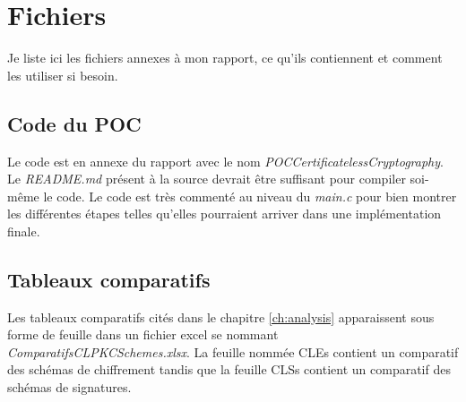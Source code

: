 \chapter{Fichiers}
\label{ch:fichiers}
Je liste ici les fichiers annexes à mon rapport, ce qu'ils contiennent et comment les utiliser si besoin.
\section{Code du POC}
Le code est en annexe du rapport avec le nom \textit{POCCertificatelessCryptography}.
Le \textit{README.md} présent à la source devrait être suffisant pour compiler soi-même le code. 
Le code est très commenté au niveau du \textit{main.c} pour bien montrer les différentes étapes telles qu'elles pourraient arriver dans une implémentation finale.
\section{Tableaux comparatifs}
Les tableaux comparatifs cités dans le chapitre \ref{ch:analysis} apparaissent sous forme de feuille dans un fichier excel se nommant \textit{ComparatifsCLPKCSchemes.xlsx}. 
La feuille nommée CLEs contient un comparatif des schémas de chiffrement tandis que la feuille CLSs contient un comparatif des schémas de signatures.
